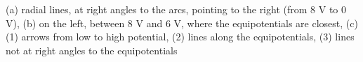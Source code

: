 (a) radial lines, at right angles to the arcs, pointing to the right (from 8 V to 0 V), (b) on the left, between 8 V and 6 V, where the equipotentials are closest, (c) (1) arrows from low to high potential, (2) lines along the equipotentials, (3) lines not at right angles to the equipotentials
